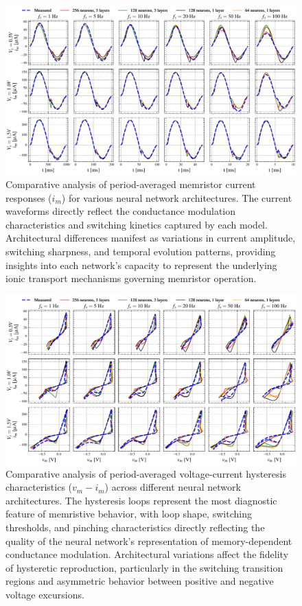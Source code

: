 \documentclass[11pt, oneside]{article}
\begin{document}
\begin{figure}[htbp!]
    \centering
    \includegraphics[width=\linewidth]{sample_results/simulated_ims.pdf}
    \caption{Comparative analysis of period-averaged memristor current responses ($i_m$) for various neural network architectures. The current waveforms directly reflect the conductance modulation characteristics and switching kinetics captured by each model. Architectural differences manifest as variations in current amplitude, switching sharpness, and temporal evolution patterns, providing insights into each network's capacity to represent the underlying ionic transport mechanisms governing memristor operation.}
\end{figure}

\begin{figure}[htbp!]
    \centering
    \includegraphics[width=\linewidth]{sample_results/simulated_histeresis.pdf}
    \caption{Comparative analysis of period-averaged voltage-current hysteresis characteristics ($v_m - i_m$) across different neural network architectures. The hysteresis loops represent the most diagnostic feature of memristive behavior, with loop shape, switching thresholds, and pinching characteristics directly reflecting the quality of the neural network's representation of memory-dependent conductance modulation. Architectural variations affect the fidelity of hysteretic reproduction, particularly in the switching transition regions and asymmetric behavior between positive and negative voltage excursions.}
\end{figure}
\end{document}
